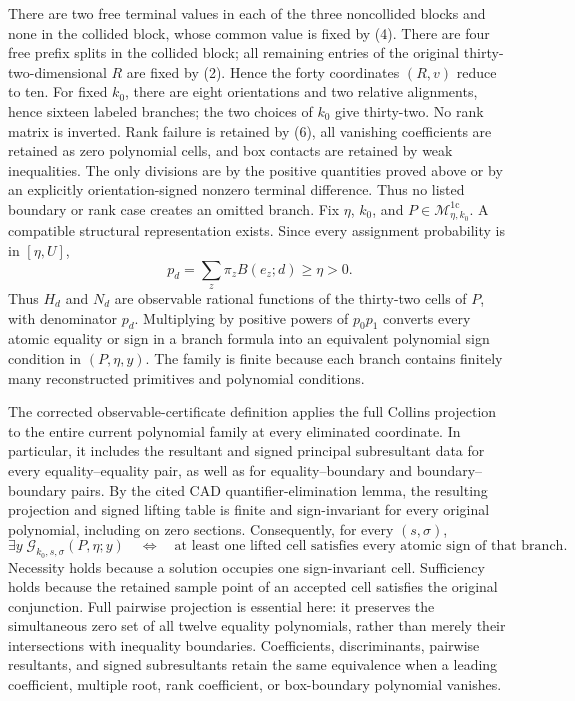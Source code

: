 There are two free terminal values in each of the three noncollided blocks and none in the collided block, whose common value is fixed by (4).  There are four free prefix splits in the collided block; all remaining entries of the original thirty-two-dimensional \(R\) are fixed by (2).  Hence the forty coordinates \((R,v)\) reduce to ten.  For fixed \(k_0\), there are eight orientations and two relative alignments, hence sixteen labeled branches; the two choices of \(k_0\) give thirty-two.  No rank matrix is inverted.  Rank failure is retained by (6), all vanishing coefficients are retained as zero polynomial cells, and box contacts are retained by weak inequalities.  The only divisions are by the positive quantities proved above or by an explicitly orientation-signed nonzero terminal difference.  Thus no listed boundary or rank case creates an omitted branch.
Fix \(\eta\), \(k_0\), and \(P\in\mathcal M_{\eta,k_0}^{1\mathrm c}\).  A compatible structural representation exists.  Since every assignment probability is in \([\eta,U]\),
\[
 p_d=\sum_z\pi_zB(e_z;d)\geq\eta>0.
 \tag{12}
\]
Thus \(H_d\) and \(N_d\) are observable rational functions of the thirty-two cells of \(P\), with denominator \(p_d\).  Multiplying by positive powers of \(p_0p_1\) converts every atomic equality or sign in a branch formula into an equivalent polynomial sign condition in \((P,\eta,y)\).  The family is finite because each branch contains finitely many reconstructed primitives and polynomial conditions.

The corrected observable-certificate definition applies the full Collins projection to the entire current polynomial family at every eliminated coordinate.  In particular, it includes the resultant and signed principal subresultant data for every equality--equality pair, as well as for equality--boundary and boundary--boundary pairs.  By the cited CAD quantifier-elimination lemma, the resulting projection and signed lifting table is finite and sign-invariant for every original polynomial, including on zero sections.  Consequently, for every \((s,\sigma)\),
\[
 \exists y\;\mathscr G_{k_0,s,\sigma}(P,\eta;y)
 \quad\Longleftrightarrow\quad
 \text{at least one lifted cell satisfies every atomic sign of that branch.}
 \tag{13}
\]
Necessity holds because a solution occupies one sign-invariant cell.  Sufficiency holds because the retained sample point of an accepted cell satisfies the original conjunction.  Full pairwise projection is essential here: it preserves the simultaneous zero set of all twelve equality polynomials, rather than merely their intersections with inequality boundaries.  Coefficients, discriminants, pairwise resultants, and signed subresultants retain the same equivalence when a leading coefficient, multiple root, rank coefficient, or box-boundary polynomial vanishes.

